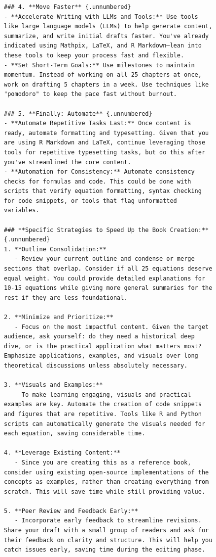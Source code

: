 \documentclass[
  12 pt,
  a4paper,
]{book}
\numberwithin{equation}{section}
\theoremstyle{plain}      %
\theoremstyle{definition} %
\theoremstyle{remark}     %
\theoremstyle{note}         %
\begin{document}
\begin{figure}
\begin{verbatim}
### 4. **Move Faster** {.unnumbered}
- **Accelerate Writing with LLMs and Tools:** Use tools like large language models (LLMs) to help generate content, summarize, and write initial drafts faster. You've already indicated using Mathpix, LaTeX, and R Markdown—lean into these tools to keep your process fast and flexible.
- **Set Short-Term Goals:** Use milestones to maintain momentum. Instead of working on all 25 chapters at once, work on drafting 5 chapters in a week. Use techniques like "pomodoro" to keep the pace fast without burnout.

### 5. **Finally: Automate** {.unnumbered}
- **Automate Repetitive Tasks Last:** Once content is ready, automate formatting and typesetting. Given that you are using R Markdown and LaTeX, continue leveraging those tools for repetitive typesetting tasks, but do this after you've streamlined the core content.
- **Automation for Consistency:** Automate consistency checks for formulas and code. This could be done with scripts that verify equation formatting, syntax checking for code snippets, or tools that flag unformatted variables.

### **Specific Strategies to Speed Up the Book Creation:** {.unnumbered}
1. **Outline Consolidation:**
   - Review your current outline and condense or merge sections that overlap. Consider if all 25 equations deserve equal weight. You could provide detailed explanations for 10-15 equations while giving more general summaries for the rest if they are less foundational.

2. **Minimize and Prioritize:** 
   - Focus on the most impactful content. Given the target audience, ask yourself: do they need a historical deep dive, or is the practical application what matters most? Emphasize applications, examples, and visuals over long theoretical discussions unless absolutely necessary.

3. **Visuals and Examples:**
   - To make learning engaging, visuals and practical examples are key. Automate the creation of code snippets and figures that are repetitive. Tools like R and Python scripts can automatically generate the visuals needed for each equation, saving considerable time.

4. **Leverage Existing Content:**
   - Since you are creating this as a reference book, consider using existing open-source implementations of the concepts as examples, rather than creating everything from scratch. This will save time while still providing value.

5. **Peer Review and Feedback Early:**
   - Incorporate early feedback to streamline revisions. Share your draft with a small group of readers and ask for their feedback on clarity and structure. This will help you catch issues early, saving time during the editing phase.


\end{verbatim}
\end{figure}
\end{document}
